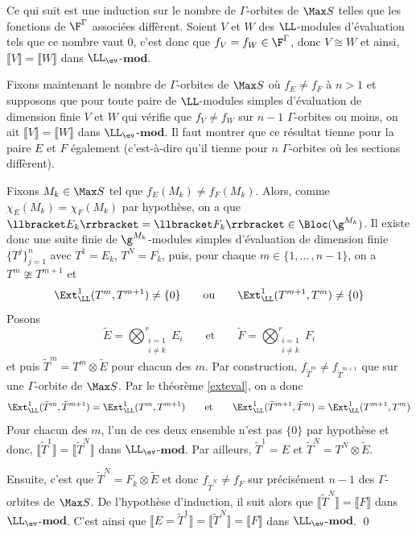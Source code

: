 \begin{Prop}
\begin{pre}
Ce qui suit est une induction sur le nombre de $\Gamma$-orbites de $\Max S$ telles que les fonctions de $\F^\Gamma$ associées diffèrent. Soient $V$ et $W$ des $\LL$-modules d'évaluation tels que ce nombre vaut $0$, c'est donc que $f_V = f_W \in \F^\Gamma$, donc $V \cong W$ et ainsi, $\llbracket V \rrbracket = \llbracket W \rrbracket$ dans $\LL_{\ev}$-$\mathbf{mod}$.

Fixons maintenant le nombre de $\Gamma$-orbites de $\Max S$ où $f_E \neq f_F$ à $n > 1$ et supposons que pour toute paire de $\LL$-modules simples d'évaluation de dimension finie $V$ et $W$ qui vérifie que $f_V \neq f_W$ sur $n-1$ $\Gamma$-orbites ou moins, on ait $\llbracket V \rrbracket = \llbracket W \rrbracket$ dans $\LL_{\ev}$-$\mathbf{mod}$. Il faut montrer que ce résultat tienne pour la paire $E$ et $F$ également (c'est-à-dire qu'il tienne pour $n$ $\Gamma$-orbites où les sections diffèrent).

Fixons $M_k \in \Max S$ tel que $f_E(M_k) \neq f_F(M_k)$. Alors, comme $\chi_E(M_k) = \chi_F(M_k)$ par hypothèse, on a que $\llbracket E_k \rrbracket = \llbracket F_k \rrbracket \in \Bloc(\g^{M_k})$. Il existe donc une suite finie de $\g^{M_k}$-modules simples d'évaluation de dimension finie $\{T^j\}_{j=1}^n$ avec $T^1 = E_k$, $T^N = F_k$, puis, pour chaque $m \in \{1,...\,,n-1\}$, on a $T^m \ncong T^{m+1}$ et
$$ \Ext^1_\LL(T^m,T^{m+1}) \neq \{0\} \qquad \text{ou} \qquad \Ext^1_\LL(T^{m+1},T^m) \neq \{0\} $$
Posons 
$$ \tilde{E} = \bigotimes_{\substack{i=1 \\ i \neq k}}^r E_i \qquad \text{et} \qquad \tilde{F} = \bigotimes_{\substack{i=1 \\ i \neq k}}^r F_i $$
et puis $\tilde{T}^m = T^m \otimes \tilde{E}$ pour chacun des $m$. Par construction, $f_{\tilde{T}^m} \neq f_{\tilde{T}^{m+1}}$ que sur une $\Gamma$-orbite de $\Max S$. Par le théorème \ref{exteval}, on a donc
$$ \Ext^1_\LL(\tilde{T}^m,\tilde{T}^{m+1}) = \Ext^1_\LL(T^m,T^{m+1}) \qquad \text{et} \qquad \Ext^1_\LL(\tilde{T}^{m+1},\tilde{T}^m) = \Ext^1_\LL(T^{m+1},T^m) $$
Pour chacun des $m$, l'un de ces deux ensemble n'est pas $\{0\}$ par hypothèse et donc, \linebreak $\llbracket \tilde{T}^1 \rrbracket = \llbracket \tilde{T}^N \rrbracket$ dans $\LL_{\ev}$-$\mathbf{mod}$. Par ailleurs, $\tilde{T}^1 = E$ et $\tilde{T}^N = T^N \otimes \tilde{E}$.

Ensuite, c'est que $\tilde{T}^N = F_k \otimes \tilde{E}$ et donc $f_{\tilde{T}^N} \neq f_F$ sur précisément $n-1$ des $\Gamma$-orbites de $\Max S$. De l'hypothèse d'induction, il suit alors que $\llbracket \tilde{T}^N \rrbracket =  \llbracket F \rrbracket$ dans $\LL_{\ev}$-$\mathbf{mod}$. C'est ainsi que $\llbracket E = \tilde{T}^1 \rrbracket = \llbracket \tilde{T}^N\rrbracket = \llbracket F \rrbracket$ dans $\LL_{\ev}$-$\mathbf{mod}$.
\qed
\end{pre}
\end{Prop}

